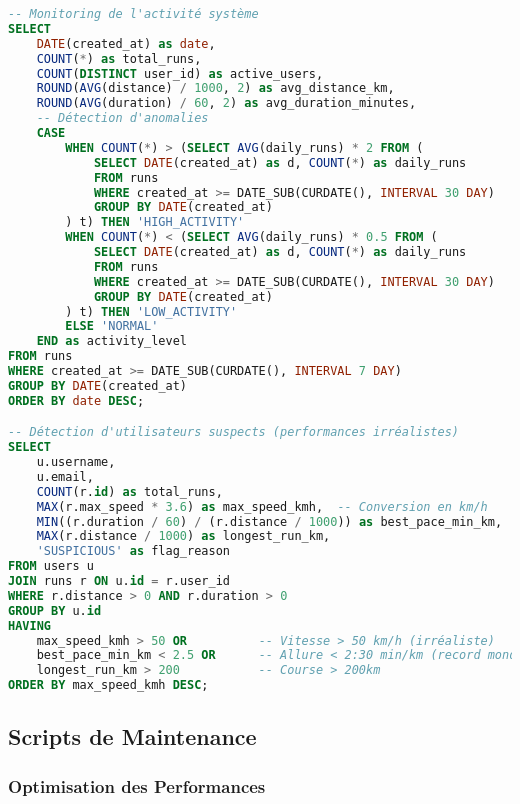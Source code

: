 \begin{lstlisting}[language=sql]
-- Monitoring de l'activité système
SELECT 
    DATE(created_at) as date,
    COUNT(*) as total_runs,
    COUNT(DISTINCT user_id) as active_users,
    ROUND(AVG(distance) / 1000, 2) as avg_distance_km,
    ROUND(AVG(duration) / 60, 2) as avg_duration_minutes,
    -- Détection d'anomalies
    CASE 
        WHEN COUNT(*) > (SELECT AVG(daily_runs) * 2 FROM (
            SELECT DATE(created_at) as d, COUNT(*) as daily_runs 
            FROM runs 
            WHERE created_at >= DATE_SUB(CURDATE(), INTERVAL 30 DAY)
            GROUP BY DATE(created_at)
        ) t) THEN 'HIGH_ACTIVITY'
        WHEN COUNT(*) < (SELECT AVG(daily_runs) * 0.5 FROM (
            SELECT DATE(created_at) as d, COUNT(*) as daily_runs 
            FROM runs 
            WHERE created_at >= DATE_SUB(CURDATE(), INTERVAL 30 DAY)
            GROUP BY DATE(created_at)
        ) t) THEN 'LOW_ACTIVITY'
        ELSE 'NORMAL'
    END as activity_level
FROM runs
WHERE created_at >= DATE_SUB(CURDATE(), INTERVAL 7 DAY)
GROUP BY DATE(created_at)
ORDER BY date DESC;

-- Détection d'utilisateurs suspects (performances irréalistes)
SELECT 
    u.username,
    u.email,
    COUNT(r.id) as total_runs,
    MAX(r.max_speed * 3.6) as max_speed_kmh,  -- Conversion en km/h
    MIN((r.duration / 60) / (r.distance / 1000)) as best_pace_min_km,
    MAX(r.distance / 1000) as longest_run_km,
    'SUSPICIOUS' as flag_reason
FROM users u
JOIN runs r ON u.id = r.user_id
WHERE r.distance > 0 AND r.duration > 0
GROUP BY u.id
HAVING 
    max_speed_kmh > 50 OR          -- Vitesse > 50 km/h (irréaliste)
    best_pace_min_km < 2.5 OR      -- Allure < 2:30 min/km (record mondial)
    longest_run_km > 200           -- Course > 200km
ORDER BY max_speed_kmh DESC;
\end{lstlisting}

\subsection{Scripts de Maintenance}

\subsubsection{Optimisation des Performances}

